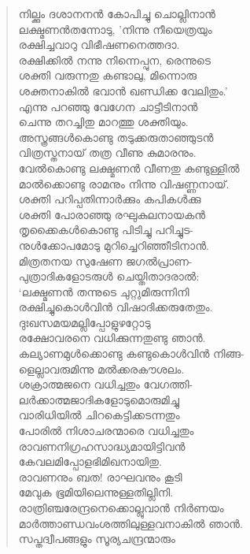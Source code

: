 \begin{verse}
നില്ക്കും ദശാനനന്‍ കോപിച്ചു ചൊല്ലിനാന്‍\\
ലക്ഷ്മണന്‍തന്നോടു, ’നിന്നു നീയെത്രയും\\
രക്ഷിച്ചവാറു വിഭീഷണനെത്തദാ.\\
രക്ഷിക്കില്‍ നന്നു നിന്നെപ്പുന, രെന്നുടെ\\
ശക്തി വരുന്നതു കണ്ടാലു, മിന്നൊരു\\
ശക്തനാകില്‍ ഭവാന്‍ ഖണ്ഡിക്ക വേലിതും.’\\
എന്നു പറഞ്ഞു വേഗേന ചാട്ടീടിനാന്‍\\
ചെന്നു തറച്ചിതു മാറത്തു ശക്തിയും.\\
അസ്ത്രങ്ങള്‍കൊണ്ടു തടുക്കരുതാഞ്ഞുടന്‍\\
വിത്രസ്തനായ് തത്ര വീണു കുമാരനും.\\
വേല്‍കൊണ്ടു ലക്ഷ്മണന്‍ വീണതു കണ്ടുള്ളില്‍\\
മാല്‍ക്കൊണ്ടു രാമനും നിന്നു വിഷണ്ണനായ്.\\
ശക്തി പറിപ്പതിന്നാര്‍ക്കും കപികള്‍ക്കു\\
ശക്തി പോരാഞ്ഞു രഘുകുലനായകന്‍\\
തൃക്കൈകള്‍കൊണ്ടു പിടിച്ചു പറിച്ചുട-\\
നുള്‍ക്കോപമോടു മുറിച്ചെറിഞ്ഞീടിനാന്‍.\\
മിത്രതനയ സുഷേണ ജഗല്‍പ്രാണ-\\
പുത്രാദികളോടരുള്‍ ചെയ്തിതാദരാല്‍:\\
‘ലക്ഷ്മണന്‍ തന്നുടെ ചുറ്റുമിരുന്നിനി\\
രക്ഷിച്ചുകൊള്‍വിന്‍ വിഷാദിക്കരുതേതും.\\
ദുഃഖസമയമല്ലിപ്പോളുഴറ്റോടു\\
രക്ഷോവരനെ വധിക്കുന്നതുണ്ടു ഞാന്‍.\\
കല്യാണമുള്‍ക്കൊണ്ടു കണ്ടുകൊള്‍വിന്‍ നിങ്ങ-\\
ളെല്ലാവരുമിന്നു മല്‍ക്കരകൗശലം.\\
ശക്രാത്മജനെ വധിച്ചതും വേഗത്തി-\\
ലര്‍ക്കാത്മജാദികളോടുമൊരുമിച്ചു\\
വാരിധിയില്‍ ചിറകെട്ടിക്കടന്നതും\\
പോരില്‍ നിശാചരന്മാരെ വധിച്ചതും\\
രാവണനിഗ്രഹസാദ്ധ്യമായിട്ടിവന്‍\\
കേവലമിപ്പോളഭിമിഖനായിതു.\\
രാവണനും ബത! രാഘവനും കൂടി\\
മേവുക ഭൂമിയിലെന്നുള്ളതില്ലിനി.\\
രാത്രിഞ്ചരേന്ദ്രനെക്കൊല്ലുവാന്‍ നിര്‍ണയം\\
മാര്‍ത്താണ്ഡവംശത്തിലുള്ളവനാകില്‍ ഞാന്‍.\\
സപ്തദ്വീപങ്ങളും സൂര്യചന്ദ്രന്മാരും\\

\end{verse}
